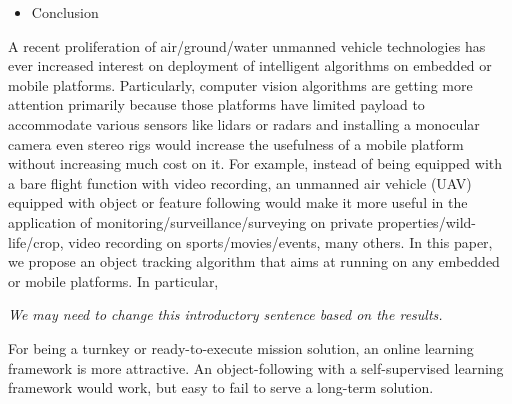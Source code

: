 \documentclass[10pt,twocolumn,letterpaper]{article}
\newcounter{ct}
\begin{document}
\begin{itemize}
\begin{itemize}
  context regressor for translation over significant deformation and
  target regressor for scale variation.
\item MEEM (Multiple Experts using Entropy Minimization)
  \cite{zhang2014meem}.
\item SAMF (Scale Adaptive KCF)
\item STC (fast tracking via Spatio-Temporal Context learning)
  \cite{zhang2014fast}: 
\item Struck (Structured Output Tracking with Kernels)
\end{itemize}
\begin{itemize}
\item Visual tracker benchmark (VTB)
\item DTB-70: w/ and w/o motion estimation,
\item UAV123 \footnote{A set of images acquired from an UAV is called
  ``UAV123'' and publicly available from
  https://ivul.kaust.edu.sa/Pages/Dataset-UAV123.aspx}
\item VOT
\end{itemize}
\item Conclusion
\end{itemize}

A recent proliferation of air/ground/water unmanned vehicle
technologies has ever increased interest on deployment of intelligent
algorithms on embedded or mobile platforms. Particularly, computer
vision algorithms are getting more attention primarily because those
platforms have limited payload to accommodate various sensors like
lidars or radars and installing a monocular camera even stereo rigs
would increase the usefulness of a mobile platform without increasing
much cost on it. For example, instead of being equipped with a bare
flight function with video recording, an unmanned air vehicle (UAV)
equipped with object or feature following would make it more useful in
the application of monitoring/surveillance/surveying on private
properties/wild-life/crop, video recording on sports/movies/events,
many others. In this paper, we propose an object tracking algorithm
that aims at running on any embedded or mobile platforms. In
particular,

{\it We may need to change this introductory sentence based on the
  results.}

For being a turnkey or ready-to-execute mission solution, an online
learning framework is more attractive. An object-following with a
self-supervised learning framework would work, but easy to fail to
serve a long-term solution.
\end{document}
